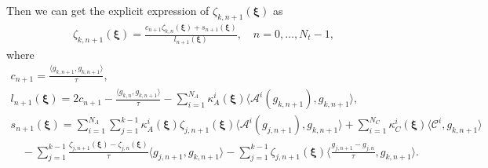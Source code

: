 \documentclass[10pt,a4paper]{article}
\numberwithin{equation}{section}
\numberwithin{lemma}{section}
\numberwithin{example}{section}
\numberwithin{definition}{section}
\numberwithin{assumption}{section}
\numberwithin{theorem}{section}
\numberwithin{proposition}{section}
\numberwithin{corollary}{section}
\numberwithin{remark}{section}
\def\[{\begin{equation}}
\begin{document}
Then we can get the explicit expression of $\zeta_{k,n+1}(\bm{\xi})$ as 
\begin{equation}
    \label{eq-iter-t}
    \begin{aligned}
        \zeta_{k,n+1}(\bm{\xi})=\frac{c_{n+1}\zeta_{k,n}(\bm{\xi})+s_{n+1}(\bm{\xi})}{l_{n+1}(\bm{\xi})},
        \quad 
        n=0,\ldots, N_t-1,
    \end{aligned}
\end{equation}
where
$$
\begin{array}{lll}
\displaystyle 
c_{n+1}=\frac{\langle g_{k,n+1},g_{k,n+1}\rangle}{\tau},
\\[2mm]
\displaystyle
l_{n+1}(\bm{\xi}) =2c_{n+1}-\frac{\langle g_{k,n},g_{k,n+1}\rangle}{\tau}
        -\sum_{i=1}^{N_A}\kappa_A^i(\bm{\xi}) \langle \mathcal{A}^i(g_{k,n+1}),g_{k,n+1}\rangle,\\
\displaystyle
s_{n+1}(\bm{\xi})
=\sum_{i=1}^{N_A} \sum_{j=1}^{k-1}\kappa_A^i(\bm{\xi})\zeta_{j,n+1}(\bm{\xi})\langle \mathcal{A}^i(g_{j,n+1}),g_{k,n+1}\rangle
+\sum_{i=1}^{N_C}\kappa_C^i(\bm{\xi})\langle \mathcal{C}^i,g_{k,n+1}\rangle
\\
\quad  
\displaystyle
-\sum_{j=1}^{k-1}\frac{\zeta_{j,n+1}(\bm{\xi})-\zeta_{j,n}(\bm{\xi})}{\tau}\langle g_{j,n+1},g_{k,n+1}\rangle
-\sum_{j=1}^{k-1}\zeta_{j,n+1}(\bm{\xi})\Big\langle 
\frac{g_{j,n+1}-g_{j,n}}{\tau},g_{k,n+1}\Big\rangle.
\end{array}
$$
\end{document}
